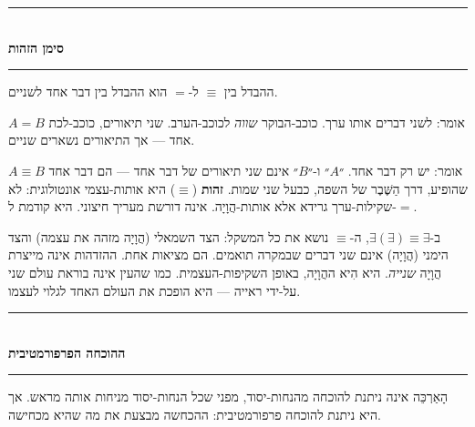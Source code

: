 \documentclass[10pt, openany, oneside]{book}
\renewcommand{\normalsize}{\fontsize{10}{13}\selectfont}
\begin{document}
\vspace{1.5em}


\begin{center}
    \rule{0.3\textwidth}{0.4pt}\\[0.5em]
    {\normalsize\bfseries\textsc{סימן הזהות}}\\[0.3em]
    \rule{0.3\textwidth}{0.4pt}
\end{center}

\vspace{1em}

\noindent ההבדל בין $\equiv$ ל-$=$ הוא ההבדל בין דבר אחד לשניים.

$A = B$ אומר: לשני דברים אותו ערך. כוכב-הבוקר \textit{שווה} לכוכב-הערב. שני תיאורים, כוכב-לכת אחד — אך התיאורים נשארים שניים.

$A \equiv B$ אומר: יש רק דבר אחד. ״$A$״ ו-״$B$״ אינם שני תיאורים של דבר אחד — הם דבר אחד שהופיע, דרך הַשֶּׁבֶר של השפה, כבעל שני שמות. \textbf{זהות} ($\equiv$) היא אותות-עצמי אונטולוגית: לא שקילות-ערך גרידא אלא אותות-הֲוָיָה. אינה דורשת מעריך חיצוני. היא קודמת ל-$=$.

ב-$\exists(\exists) \equiv \exists$, ה-$\equiv$ נושא את כל המשקל: הצד השמאלי (הֲוָיָה מזהה את עצמה) והצד הימני (הֲוָיָה) אינם שני דברים שבמקרה תואמים. הם מציאות אחת. ההזדהות אינה מייצרת הֲוָיָה \textit{שנייה}. היא הִיא ההֲוָיָה, באופן השקיפות-העצמית. כמו שהעין אינה בוראת עולם שני על-ידי ראייה — היא הופכת את העולם האחד לגלוי לעצמו.

\vspace{1.5em}


\begin{center}
    \rule{0.3\textwidth}{0.4pt}\\[0.5em]
    {\normalsize\bfseries\textsc{ההוכחה הפרפורמטיבית}}\\[0.3em]
    \rule{0.3\textwidth}{0.4pt}
\end{center}

\vspace{1em}

\noindent הָאַרְכֵּה אינה ניתנת להוכחה מהנחות-יסוד, מפני שכל הנחות-יסוד מניחות אותה מראש. אך היא ניתנת להוכחה פרפורמטיבית: ההכחשה מבצעת את מה שהיא מכחישה.
\end{document}

